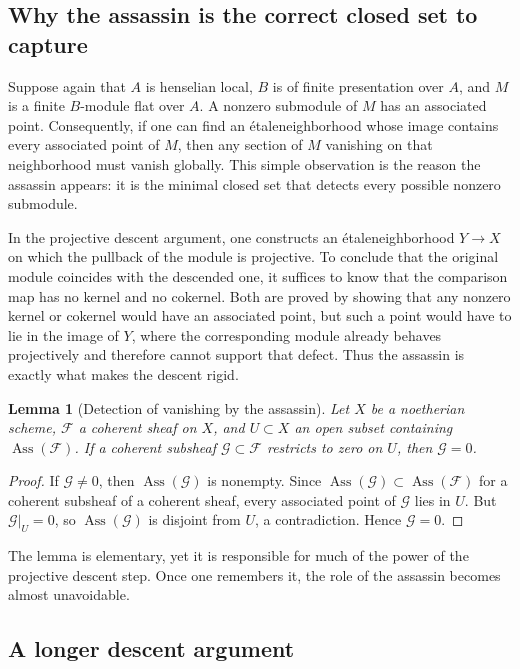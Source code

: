 \documentclass[11pt,oneside]{article}
\newtheorem{lemma}[theorem]{Lemma}
\newcommand{\F}{\mathcal F}
\newcommand{\G}{\mathcal G}
\newcommand{\Ass}{\operatorname{Ass}}
\newcommand{\etale}{\'etale}
\begin{document}
\subsection{Why the assassin is the correct closed set to capture}

Suppose again that $A$ is henselian local, $B$ is of finite presentation over $A$, and $M$ is a finite $B$-module flat over $A$.  A nonzero submodule of $M$ has an associated point.  Consequently, if one can find an \etale neighborhood whose image contains every associated point of $M$, then any section of $M$ vanishing on that neighborhood must vanish globally.  This simple observation is the reason the assassin appears: it is the minimal closed set that detects every possible nonzero submodule.

In the projective descent argument, one constructs an \etale neighborhood $Y\to X$ on which the pullback of the module is projective.  To conclude that the original module coincides with the descended one, it suffices to know that the comparison map has no kernel and no cokernel.  Both are proved by showing that any nonzero kernel or cokernel would have an associated point, but such a point would have to lie in the image of $Y$, where the corresponding module already behaves projectively and therefore cannot support that defect.  Thus the assassin is exactly what makes the descent rigid.

\begin{lemma}[Detection of vanishing by the assassin]\label{lem:assassin-detects-vanishing}
Let $X$ be a noetherian scheme, $\F$ a coherent sheaf on $X$, and $U\subset X$ an open subset containing $\Ass(\F)$.  If a coherent subsheaf $\G\subset \F$ restricts to zero on $U$, then $\G=0$.
\end{lemma}

\begin{proof}
If $\G\neq 0$, then $\Ass(\G)$ is nonempty.  Since $\Ass(\G)\subset \Ass(\F)$ for a coherent subsheaf of a coherent sheaf, every associated point of $\G$ lies in $U$.  But $\G|_U=0$, so $\Ass(\G)$ is disjoint from $U$, a contradiction.  Hence $\G=0$.
\end{proof}

The lemma is elementary, yet it is responsible for much of the power of the projective descent step.  Once one remembers it, the role of the assassin becomes almost unavoidable.

\subsection{A longer descent argument}
\end{document}

